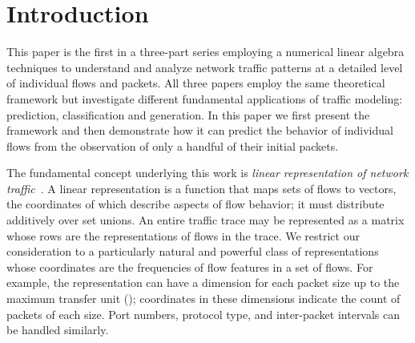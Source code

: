 \documentclass[conference]{IEEEtran}
\title{\vspace{-0.25em}\thetitle}
\author{
{\large{Stefan~Karpinski, John~R.~Gilbert, Elizabeth~M.~Belding}} \vspace{0.25em}\\
Department of Computer Science \\
University of California, Santa Barbara \vspace{0.35em}\\
\textit{\{sgk,gilbert,ebelding\}@cs.ucsb.edu}
}
\begin{document}
\maketitle

\section{Introduction}


This paper is the first in a three-part series employing a numerical linear algebra techniques to understand and analyze network traffic patterns at a detailed level of individual flows and packets.\flownote
All three papers employ the same theoretical framework but investigate different fundamental applications of traffic modeling:
prediction, classification and generation.
In this paper we first present the framework and then demonstrate how it can predict the behavior of individual flows from the observation of only a handful of their initial packets.

The fundamental concept underlying this work is \emph{linear representation of network traffic}~\cite{Karpinski08}.
A linear representation is a function that maps sets of flows to vectors, the coordinates of which describe aspects of flow behavior;
it must distribute additively over set unions.
An entire traffic trace may be represented as a matrix whose rows are the representations of flows in the trace.
We restrict our consideration to a particularly natural and powerful class of representations whose coordinates are the frequencies of flow features in a set of flows.
For example, the representation can have a dimension for each packet size up to the maximum transfer unit ();
coordinates in these dimensions indicate the count of packets of each size.
Port numbers,  protocol type, and inter-packet intervals can be handled similarly.
\end{document}

